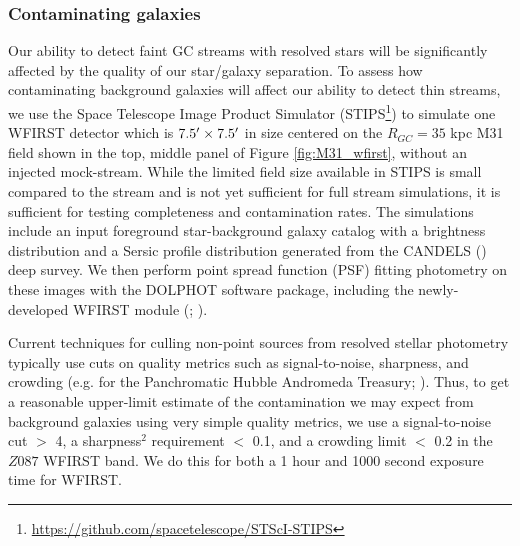 \documentclass[twocolumn]{aastex62}
\begin{document}
\subsubsection{Contaminating galaxies}
\label{sec:contamination}
Our ability to detect faint GC streams with resolved stars will be significantly affected by the quality of our star/galaxy separation.  To assess how contaminating background galaxies will affect our ability to detect thin streams, we use the Space Telescope Image Product Simulator (STIPS\footnote{\url{https://github.com/spacetelescope/STScI-STIPS}}) to simulate one WFIRST detector which is $7.5\mbox{$^\prime$} \times 7.5\mbox{$^\prime$}$ in size centered on the $R_{GC} = 35$ kpc M31 field shown in the top, middle panel of Figure \ref{fig:M31_wfirst}, without an injected mock-stream.  While the limited field size available in STIPS is small compared to the stream and is not yet sufficient for full stream simulations, it is sufficient for testing completeness and contamination rates.  The simulations include an input foreground star-background galaxy catalog with a brightness distribution and a Sersic profile distribution generated from the CANDELS (\citealt{koekemoer11}) deep survey.  We then perform point spread function (PSF) fitting photometry on these images with the DOLPHOT software package, including the newly-developed WFIRST module (\citealt{dolphin00}; \citealt{dolphin16}).

Current techniques for culling non-point sources from resolved stellar photometry typically use cuts on quality metrics such as signal-to-noise, sharpness, and crowding (e.g. for the Panchromatic Hubble Andromeda Treasury; \citealt{williams14}).  Thus, to get a reasonable upper-limit estimate of the contamination we may expect from background galaxies using very simple quality metrics, we use a signal-to-noise cut $>$ 4, a sharpness$^2$ requirement $<$ 0.1, and a crowding limit $<$ 0.2 in the $Z087$ WFIRST band. We do this for both a 1 hour and 1000 second exposure time for WFIRST. 
\end{document}
